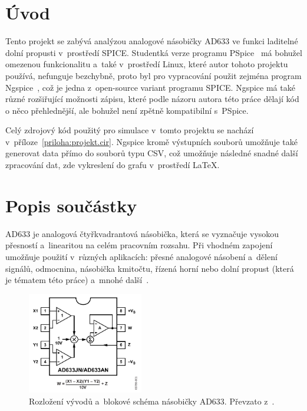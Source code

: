 \documentclass{protokol}
\begin{document}
	\maketitle

\section*{Úvod}
	Tento projekt se zabývá analýzou analogové násobičky AD633 ve funkci laditelné dolní propusti v~prostředí SPICE. Studentká verze programu PSpice~\cite{cadence} má bohužel omezenou funkcionalitu a~také v~prostředí Linux, které autor tohoto projektu používá, nefunguje bezchybně, proto byl pro vypracování použit zejména program Ngspice~\cite{ngspice}, což je jedna z~open-source variant programu SPICE. Ngspice má také různé rozšiřující možnosti zápisu, které podle názoru autora této práce dělají kód o něco přehlednější, ale bohužel není zpětně kompatibilní s~PSpice.

	Celý zdrojový kód použitý pro simulace v~tomto projektu se nachází v~příloze~\ref{priloha:projekt.cir}. Ngspice kromě výstupních souborů umožňuje také generovat data přímo do souborů typu CSV, což umožňuje následné snadné další zpracování dat, zde vykreslení do grafu v~prostředí LaTeX.
\section{Popis součástky}
	AD633 je analogová čtyřkvadrantová násobička, která se vyznačuje vysokou přesností a~linearitou na celém pracovním rozsahu. Při vhodném zapojení umožňuje použití v~různých aplikacích: přesné analogové násobení a~dělení signálů, odmocnina, násobička kmitočtu, řízená horní nebo dolní propust (která je tématem této práce) a~mnohé další~\cite{ad633datasheet}.

	\begin{figure}[h!]
		\centering
		\includegraphics[width=0.45\textwidth]{img/ad633.png}
		\caption{Rozložení vývodů a~blokové schéma násobičky AD633. Převzato z~\cite{ad633datasheet}.}
		\label{fig:img-ad633.png}
	\end{figure}
	
\end{document}
